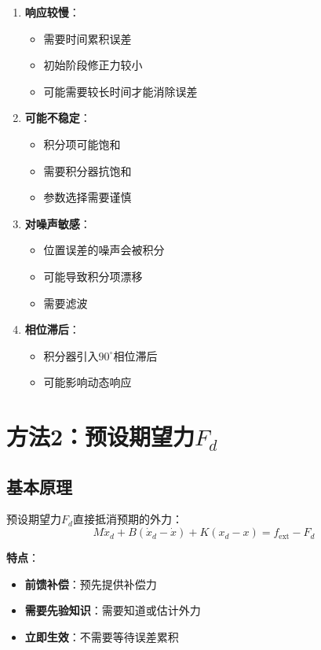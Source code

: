 \documentclass[12pt,a4paper]{article}
\begin{document}
\begin{enumerate}
\item \textbf{响应较慢}：
\begin{itemize}
\item 需要时间累积误差
\item 初始阶段修正力较小
\item 可能需要较长时间才能消除误差
\end{itemize}

\item \textbf{可能不稳定}：
\begin{itemize}
\item 积分项可能饱和
\item 需要积分器抗饱和
\item 参数选择需要谨慎
\end{itemize}

\item \textbf{对噪声敏感}：
\begin{itemize}
\item 位置误差的噪声会被积分
\item 可能导致积分项漂移
\item 需要滤波
\end{itemize}

\item \textbf{相位滞后}：
\begin{itemize}
\item 积分器引入$90^\circ$相位滞后
\item 可能影响动态响应
\end{itemize}
\end{enumerate}

\section{方法2：预设期望力$F_d$}

\subsection{基本原理}

预设期望力$F_d$直接抵消预期的外力：
\begin{equation}
M\ddot{x}_d + B(\dot{x}_d - \dot{x}) + K(x_d - x) = f_{\text{ext}} - F_d
\end{equation}

\textbf{特点}：
\begin{itemize}
\item \textbf{前馈补偿}：预先提供补偿力
\item \textbf{需要先验知识}：需要知道或估计外力
\item \textbf{立即生效}：不需要等待误差累积
\end{itemize}
\end{document}
